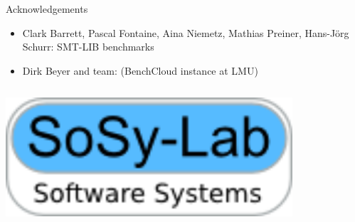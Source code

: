 \documentclass[table]{beamer}
\def\emph#1{\textcolor{MYblue}{#1}}
\begin{document}
\begin{frame}{Acknowledgements}
  \begin{itemize}
    \item \emph{Clark Barrett, Pascal Fontaine, Aina Niemetz, Mathias Preiner, Hans-Jörg Schurr}: SMT-LIB benchmarks
    \item \emph{Dirk Beyer and team}: (BenchCloud instance at LMU)
  \end{itemize}
  \bigskip

  \begin{columns}
    \begin{column}{.3\textwidth}
      \includegraphics[width=0.8\textwidth]{sosylogo.png}
    \end{column}
  \end{columns}
\end{frame}
\end{document}
